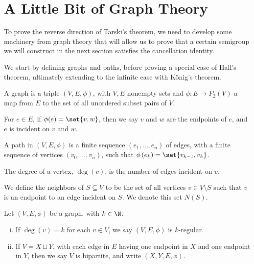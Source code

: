\section{A Little Bit of Graph Theory}
To prove the reverse direction of Tarski's theorem, we need to develop some machinery from graph theory that will allow us to prove that a certain semigroup we will construct in the next section satisfies the cancellation identity.\newline

We start by defining graphs and paths, before proving a special case of Hall's theorem, ultimately extending to the infinite case with König's theorem.
\begin{definition}
  A {graph} is a triple $\left(V,E,\phi\right)$, with $V,E$ nonempty sets and $\phi\colon E\rightarrow P_{2}(V)$ a map from $E$ to the set of all unordered subset pairs of $V$.\newline

  For $e\in E$, if $\phi(e) = \set{v,w}$, then we say $v$ and $w$ are the {endpoints} of $e$, and $e$ is {incident} on $v$ and $w$.\newline

  A {path} in $\left(V,E,\phi\right)$ is a finite sequence $\left(e_1,\dots,e_n\right)$ of edges, with a finite sequence of vertices $\left(v_0,\dots,v_n\right)$, such that $\phi\left(e_k\right) = \set{v_{k-1},v_k}$.\newline

  The {degree} of a vertex, $\deg(v)$, is the number of edges incident on $v$.\newline

  We define the {neighbors} of $S\subseteq V$ to be the set of all vertices $v\in V\setminus S$ such that $v$ is an endpoint to an edge incident on $S$. We denote this set $N(S)$.
\end{definition}

\begin{definition}
  Let $\left(V,E,\phi\right)$ be a graph, with $k\in \N$.
  \begin{enumerate}[(i)]
    \item If $\deg(v) = k$ for each $v\in V$, we say $\left(V,E,\phi\right)$ is {$k$-regular}.
    \item If $V = X\sqcup Y$, with each edge in $E$ having one endpoint in $X$ and one endpoint in $Y$, then we say $V$ is {bipartite}, and write $\left(X,Y,E,\phi\right)$.
  \end{enumerate}
\end{definition}

